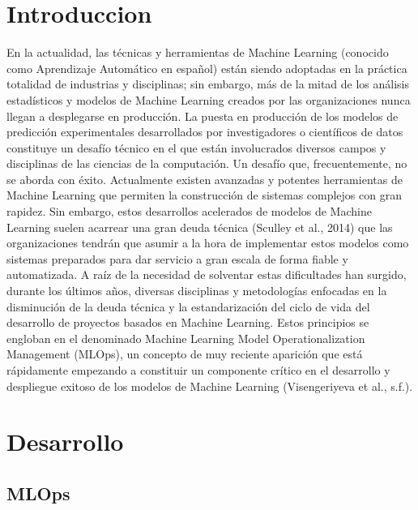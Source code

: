 \documentclass[twoside,twocolumn]{article}
\begin{document}
\section{Introduccion}
En la actualidad, las técnicas y 
herramientas de Machine Learning 
(conocido como Aprendizaje Automático en español)
 están siendo adoptadas en la práctica totalidad 
 de industrias y disciplinas; sin embargo, más de 
 la mitad de los análisis estadísticos y modelos de 
 Machine Learning creados por las organizaciones nunca 
 llegan a desplegarse en producción. La puesta en producción 
 de los modelos de predicción experimentales desarrollados por 
 investigadores o científicos de datos constituye un desafío 
 técnico en el que están involucrados diversos campos y disciplinas 
 de las ciencias de la computación. Un desafío que, frecuentemente, 
 no se aborda con éxito. Actualmente existen avanzadas y potentes 
 herramientas de Machine Learning que permiten la construcción de 
 sistemas complejos con gran rapidez. Sin embargo, estos desarrollos 
 acelerados de modelos de Machine Learning suelen acarrear una gran 
 deuda técnica (Sculley et al., 2014) que las organizaciones tendrán 
 que asumir a la hora de implementar estos modelos como sistemas 
 preparados para dar servicio a gran escala de forma fiable y
 automatizada. A raíz de la necesidad de solventar estas dificultades 
 han surgido, durante los últimos años, diversas disciplinas y 
 metodologías enfocadas en la disminución de la deuda técnica y 
 la estandarización del ciclo de vida del desarrollo de proyectos 
 basados en Machine Learning. Estos principios se engloban en el 
 denominado Machine Learning Model Operationalization Management 
 (MLOps), un concepto de muy reciente aparición que está rápidamente 
 empezando a constituir un componente crítico en el desarrollo y 
 despliegue exitoso de los modelos de Machine Learning (Visengeriyeva 
 et al., s.f.).
\begin{center}

\end{center}

\section{Desarrollo}

\subsection{MLOps}
\end{document}
